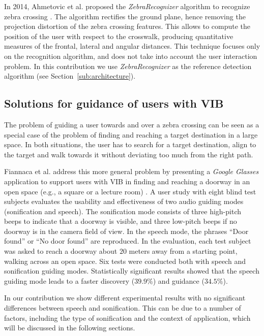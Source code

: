 \documentclass{article}
\begin{document}
In 2014, Ahmetovic et al. proposed the \emph{ZebraRecognizer} algorithm to recognize zebra crossing \cite{AhmetovicICPR2014}.
The algorithm rectifies the ground plane, hence removing the projection distortion of the zebra crossing features. This allows to compute the position of the user with respect to the crosswalk, producing quantitative measures of the frontal, lateral and angular distances.
This technique focuses only on the recognition algorithm, and does not take into account the user interaction problem.
In this contribution we use \emph{ZebraRecognizer} as the reference detection algorithm (see Section~\ref{sub:architecture}).

\subsection{Solutions for guidance of users with VIB}
\label{sub:guidanceRW}
The problem of guiding a user towards and over a zebra crossing can be seen as a special case of the problem of finding and reaching a target destination in a large space.
In both situations, the user has to search for a target destination, align to the target and walk towards it without deviating too much from the right path.

Fiannaca et al. address this more general problem by presenting a \emph{Google Glasses} application to support users with VIB in finding and reaching a doorway in an open space (e.g., a square or a lecture room) \cite{fiannaca}.
A user study with eight blind test subjects evaluates the usability and effectiveness of two audio guiding modes (sonification and speech).
The sonification mode consists of three high-pitch beeps to indicate that a doorway is visible, and three low-pitch beeps if no doorway is in the camera field of view.
In the speech mode, the phrases ``Door found'' or ``No door found'' are reproduced.
In the evaluation, each test subject was asked to reach a doorway about $20$ meters away from a starting point, walking across an open space.
Six tests were conducted both with speech and sonification guiding modes.
Statistically significant results showed that the speech guiding mode leads to a faster discovery ($39.9$\%) and guidance ($34.5$\%).

In our contribution we show different experimental results with no significant differences
between speech and sonification. This can be due to a number of factors, including the type of sonification and the context of application, which will be discussed in the following sections.
\end{document}
